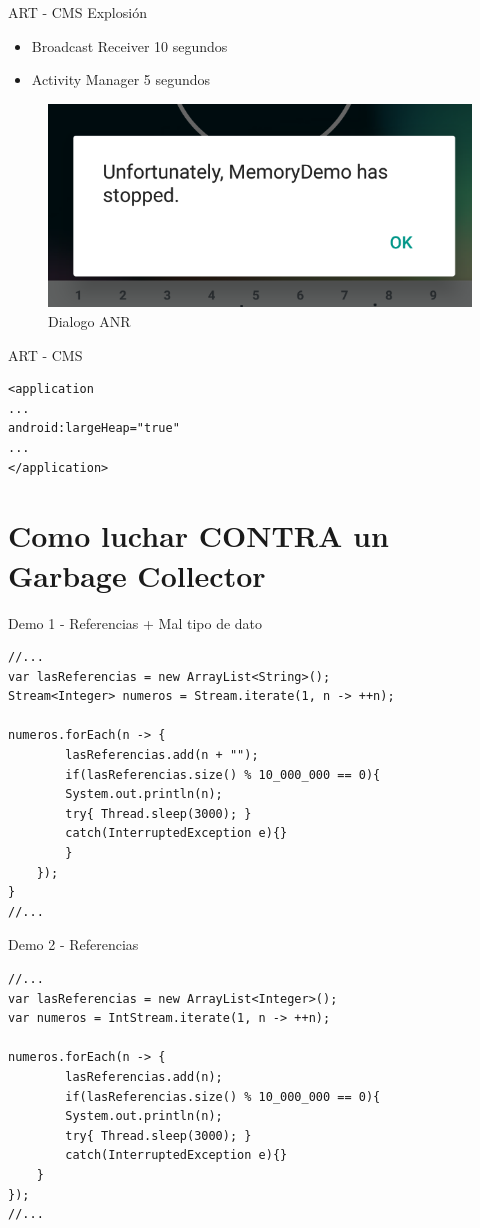 \documentclass{beamer}
\begin{document}
\begin{frame}[fragile]{ART - CMS}
Explosión
\begin{itemize}
	\item Broadcast Receiver 10 segundos 
	\item Activity Manager 5 segundos
\end{itemize}

\begin{figure}
	\centering
	\includegraphics[width=0.7\linewidth]{Images/explosion}
	\caption{Dialogo ANR}
\end{figure}

\end{frame}

\begin{frame}[fragile]{ART - CMS}
\begin{lstlisting}
<application
...
android:largeHeap="true"
...
</application>
\end{lstlisting}
\end{frame}

\section{Como luchar CONTRA un Garbage Collector}

\begin{frame}[fragile]{Demo 1 - Referencias + Mal tipo de dato}
\begin{lstlisting}
//...
var lasReferencias = new ArrayList<String>();
Stream<Integer> numeros = Stream.iterate(1, n -> ++n);

numeros.forEach(n -> {
		lasReferencias.add(n + "");
		if(lasReferencias.size() % 10_000_000 == 0){
		System.out.println(n);
		try{ Thread.sleep(3000); }
		catch(InterruptedException e){}
		}
	});
}
//...
\end{lstlisting}
\end{frame}


\begin{frame}[fragile]{Demo 2 - Referencias}
\begin{lstlisting}
//...
var lasReferencias = new ArrayList<Integer>();
var numeros = IntStream.iterate(1, n -> ++n);

numeros.forEach(n -> {
		lasReferencias.add(n);
		if(lasReferencias.size() % 10_000_000 == 0){
		System.out.println(n);
		try{ Thread.sleep(3000); }
		catch(InterruptedException e){}
	}
});
//...
\end{lstlisting}
\end{frame}
\end{document}
